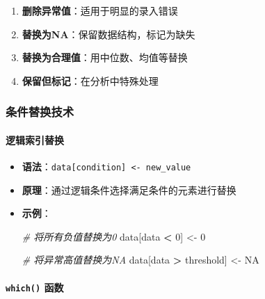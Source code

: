 \documentclass[
  twoside]{book}
\newenvironment{Shaded}{\begin{snugshade}}{\end{snugshade}}
\newcommand{\CommentTok}[1]{\textcolor[rgb]{0.56,0.35,0.01}{\textit{#1}}}
\newcommand{\ConstantTok}[1]{\textcolor[rgb]{0.56,0.35,0.01}{#1}}
\newcommand{\DecValTok}[1]{\textcolor[rgb]{0.00,0.00,0.81}{#1}}
\newcommand{\NormalTok}[1]{#1}
\newcommand{\OtherTok}[1]{\textcolor[rgb]{0.56,0.35,0.01}{#1}}
\newcommand{\SpecialCharTok}[1]{\textcolor[rgb]{0.81,0.36,0.00}{\textbf{#1}}}
\begin{document}
\begin{enumerate}
\def\labelenumi{\arabic{enumi}.}
\item
  \textbf{删除异常值}：适用于明显的录入错误
\item
  \textbf{替换为NA}：保留数据结构，标记为缺失
\item
  \textbf{替换为合理值}：用中位数、均值等替换
\item
  \textbf{保留但标记}：在分析中特殊处理
\end{enumerate}

\hypertarget{ux6761ux4ef6ux66ffux6362ux6280ux672f}{%
\subsubsection{条件替换技术}\label{ux6761ux4ef6ux66ffux6362ux6280ux672f}}

\hypertarget{ux903bux8f91ux7d22ux5f15ux66ffux6362}{%
\paragraph{逻辑索引替换}\label{ux903bux8f91ux7d22ux5f15ux66ffux6362}}

\begin{itemize}
\item
  \textbf{语法}：\texttt{data{[}condition{]}\ \textless{}-\ new\_value}
\item
  \textbf{原理}：通过逻辑条件选择满足条件的元素进行替换
\item
  \textbf{示例}：

\begin{Shaded}
\begin{Highlighting}[]
\CommentTok{\# 将所有负值替换为0}
\NormalTok{data[data }\SpecialCharTok{\textless{}} \DecValTok{0}\NormalTok{] }\OtherTok{\textless{}{-}} \DecValTok{0}

\CommentTok{\# 将异常高值替换为NA}
\NormalTok{data[data }\SpecialCharTok{\textgreater{}}\NormalTok{ threshold] }\OtherTok{\textless{}{-}} \ConstantTok{NA}
\end{Highlighting}
\end{Shaded}
\end{itemize}

\hypertarget{which-ux51fdux6570}{%
\paragraph{\texorpdfstring{\texttt{which()} 函数}{which() 函数}}\label{which-ux51fdux6570}}
\end{document}
